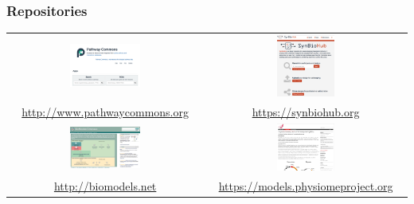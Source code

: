 \documentclass{beamer}
\begin{document}
\begin{frame}\frametitle{Repositories}
\begin{center}
{\scriptsize
\begin{tabular}{cc}
\includegraphics[width=0.375\textwidth]{figs/pathwayCommons} & 
\includegraphics[width=0.3\textwidth]{figs/synBioHub1} \\
\url{http://www.pathwaycommons.org} & \url{https://synbiohub.org} \\
\includegraphics[width=0.375\textwidth]{figs/BioModels} &
\includegraphics[width=0.3\textwidth]{figs/physiome} \\
\url{http://biomodels.net} & \url{https://models.physiomeproject.org}
\end{tabular}
}
\end{center}
\end{frame}

\end{document}
